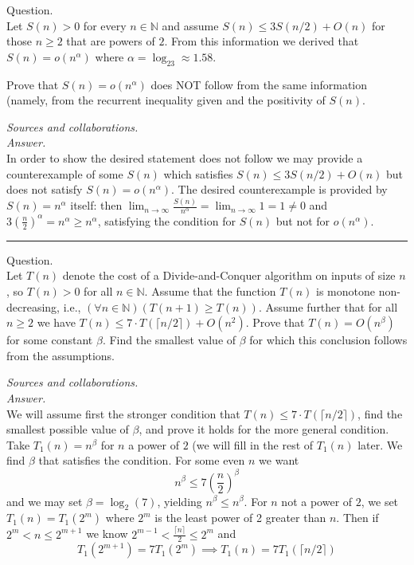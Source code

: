 \documentclass{amsart}
\begin{document}
\vspace{0.6cm}

\newpage
\Large
{}      %

 Question. \\
Let $S(n)>0$ for every $n\in \mathbb{N}$ and assume $S(n)\leq 3S(n/2)+O(n)$ for those $n\geq 2$ that are powers of $2$. From this information we derived that $S(n)=o(n^{\alpha})$ where $\alpha=\log_23\approx 1.58$.

\medskip \noindent Prove that $S(n)=o(n^\alpha)$ does NOT follow from the same information (namely, from the recurrent inequality given and the positivity of $S(n)$.

\medskip\noindent
\emph{Sources and collaborations.}\\


\medskip\noindent
\emph{Answer.}\\
In order to show the desired statement does not follow we may provide a counterexample of some $S(n)$ which satisfies $S(n)\leq 3S(n/2)+O(n)$ but does not satisfy $S(n)=o(n^\alpha)$. The desired counterexample is provided by $S(n)=n^\alpha$ itself: then $\lim_{n\to\infty}\frac{S(n)}{n^\alpha}=\lim_{n\to\infty} 1=1\neq 0$ and $3\left(\frac{n}{2}\right)^\alpha=n^\alpha\geq n^\alpha$, satisfying the condition for $S(n)$ but not for $o(n^\alpha)$. 

\bigskip\hrule

\vspace{0.5cm}

\noindent

\newpage
{}

 Question. \\
Let $T(n)$ denote the cost of a Divide-and-Conquer algorithm on inputs of size $n$, so $T(n)>0$ for all $n\in \mathbb{N}$. Assume that the function $T(n)$ is monotone non-decreasing, i.e., $(\forall n\in \mathbb{N})(T(n+1)\geq T(n))$.  Assume further that for all $n\geq 2$ we have $T(n)\leq 7\cdot T(\lceil n/2\rceil)+ O(n^2)$. Prove that $T(n) = O(n^\beta)$ for some constant $\beta$. Find the smallest value of $\beta$ for which this conclusion follows from the assumptions.

\medskip \noindent 
\emph{Sources and collaborations.}\\


\medskip \noindent
\emph{Answer.}\\
We will assume first the stronger condition that $T(n)\leq 7\cdot T(\lceil n/2\rceil)$, find the smallest possible value of $\beta$, and prove it holds for the more general condition. Take $T_1(n) = n^\beta$ for $n$ a power of $2$ (we will fill in the rest of $T_1(n)$ later. We find $\beta$ that satisfies the condition. For some even $n$ we want \[n^\beta\leq 7\left(\frac{n}{2}\right)^\beta\]
and we may set $\beta= \log_2(7)$, yielding $n^\beta\leq n^\beta$. For $n$ not a power of $2$, we set $T_1(n)=T_1(2^m)$ where $2^m$ is the least power of 2 greater than $n$. Then if $2^m<n\leq 2^{m+1}$ we know $2^{m-1}<\frac{\lceil n\rceil}{2}\leq 2^m$ and \[T_1(2^{m+1})=7T_1(2^m)\implies T_1(n)=7T_1(\lceil n/2\rceil)\]
\end{document}
